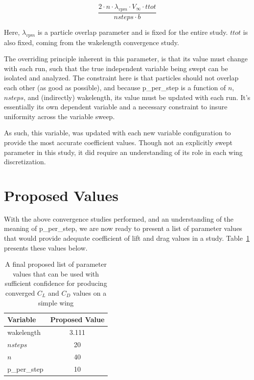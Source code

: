 \documentclass{report}
\begin{document}
\begin{equation}\label{eq:pperstep}
\frac{2 \cdot n \cdot \lambda_{vpm} \cdot V_\infty \cdot ttot}{nsteps \cdot b}
\end{equation}

Here, $\lambda_{vpm}$ is a particle overlap parameter and is fixed for the entire study. $ttot$ is also fixed, coming from the wakelength convergence study.

The overriding principle inherent in this parameter, is that its value must change with each run, such that the true independent variable being swept can be isolated and analyzed.
The constraint here is that particles should not overlap each other (as good as possible), and because p\_per\_step is a function of $n$, $nsteps$, and (indirectly) wakelength, its value must be updated with each run.
It's essentially its own dependent variable and a necessary constraint to insure uniformity across the variable sweep.

As such, this variable, was updated with each new variable configuration to provide the most accurate coefficient values.
Though not an explicitly swept parameter in this study, it did require an understanding of its role in each wing discretization.

\section{Proposed Values}

With the above convergence studies performed, and an understanding of the meaning of p\_per\_step, we are now ready to present a list of parameter values that would provide adequate coefficient of lift and drag values in a study.
Table~\ref{tab:proposed} presents these values below.



\begin{table}[H]
    \centering
    \caption{A final proposed list of parameter values that can be used with sufficient confidence for producing converged \texorpdfstring{$C_L$}{CL} and \texorpdfstring{$C_D$}{CD} values on a simple wing}\label{tab:proposed}
    \begin{tabular}{l c}
        \toprule
        \textbf{Variable} & \textbf{Proposed Value} \\
        \midrule
        wakelength & 3.111 \\
        $nsteps$ & 20 \\
        $n$ & 40 \\
        p\_per\_step & 10 \\
        \bottomrule
    \end{tabular}
\end{table}
\end{document}
